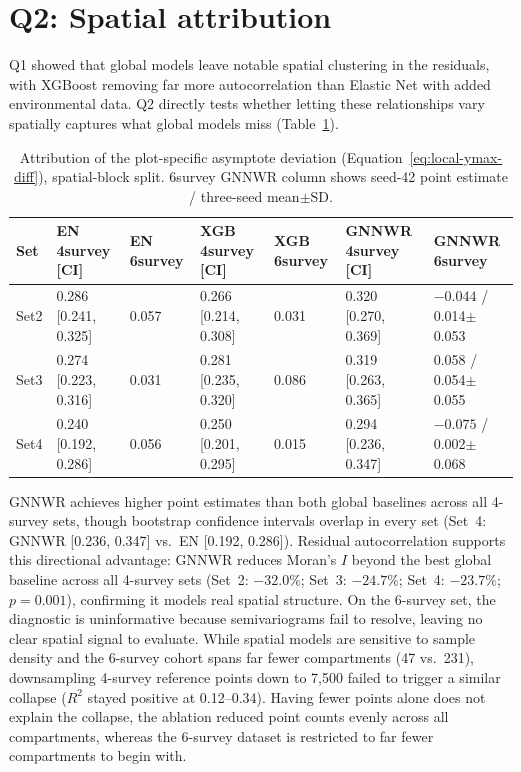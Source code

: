 \documentclass[logo,msc,ai]{infthesis}           %
\begin{document}
\section{Q2: Spatial attribution}
Q1 showed that global models leave notable spatial clustering in the residuals, with XGBoost removing far more autocorrelation than Elastic Net with added environmental data. Q2 directly tests whether letting these relationships vary spatially captures what global models miss (Table~\ref{tab:results-rq3}).
\begin{table}[!htbp]
\centering
\scriptsize
\renewcommand{\arraystretch}{1.2}
\begin{tabular}{lllllll}
\toprule
Set & EN 4survey [CI] & EN 6survey & XGB 4survey [CI] & XGB 6survey & GNNWR 4survey [CI] & GNNWR 6survey \\
\midrule
Set2 & 0.286 [0.241, 0.325] & 0.057 & 0.266 [0.214, 0.308] & 0.031 & 0.320 [0.270, 0.369] & $-0.044$ / 0.014$\pm$0.053 \\
Set3 & 0.274 [0.223, 0.316] & 0.031 & 0.281 [0.235, 0.320] & 0.086 & 0.319 [0.263, 0.365] & 0.058 / 0.054$\pm$0.055 \\
Set4 & 0.240 [0.192, 0.286] & 0.056 & 0.250 [0.201, 0.295] & 0.015 & 0.294 [0.236, 0.347] & $-0.075$ / 0.002$\pm$0.068 \\
\bottomrule
\end{tabular}
\caption{\small{Attribution of the plot-specific asymptote deviation
(Equation~\ref{eq:local-ymax-diff}), spatial-block split. 6survey GNNWR column shows
seed-42 point estimate / three-seed mean$\pm$SD.}}
\label{tab:results-rq3} %
\end{table}

GNNWR achieves higher point estimates than both global baselines across all 4-survey sets, though bootstrap confidence intervals overlap in every set (Set~4: GNNWR [0.236, 0.347] vs.\ EN [0.192, 0.286]). Residual autocorrelation supports this directional advantage: GNNWR reduces Moran's $I$ beyond the best global baseline across all 4-survey sets (Set~2: $-32.0\%$; Set~3: $-24.7\%$; Set~4: $-23.7\%$; $p = 0.001$), confirming it models real spatial structure. On the 6-survey set, the diagnostic is uninformative because semivariograms fail to resolve, leaving no clear spatial signal to evaluate. While spatial models are sensitive to sample density \cite{brunsdon1996Geographically_C6_GWR} and the 6-survey cohort spans far fewer compartments (47 vs.\ 231), downsampling 4-survey reference points down to 7,500 failed to trigger a similar collapse ($R^2$ stayed positive at 0.12--0.34). Having fewer points alone does not explain the collapse, the ablation reduced point counts evenly across all compartments, whereas the 6-survey dataset is restricted to far fewer compartments to begin with.
\end{document}
